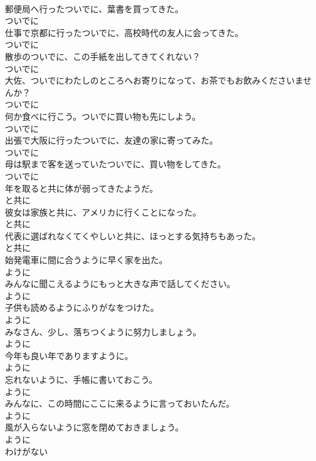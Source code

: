 \documentclass[8pt]{extreport}
\begin{document}
\begin{CJK}{UTF8}{min}
\\	郵便局へ行ったついでに、葉書を買ってきた。	
\\	ついでに
\\	仕事で京都に行ったついでに、高校時代の友人に会ってきた。	
\\	ついでに
\\	散歩のついでに、この手紙を出してきてくれない？	
\\	ついでに
\\	大佐、ついでにわたしのところへお寄りになって、お茶でもお飲みくださいませんか？	
\\	ついでに
\\	何か食べに行こう。ついでに買い物も先にしよう。	
\\	ついでに
\\	出張で大阪に行ったついでに、友達の家に寄ってみた。	
\\	ついでに
\\	母は駅まで客を送っていたついでに、買い物をしてきた。	
\\	ついでに
\\	年を取ると共に体が弱ってきたようだ。	
\\	と共に
\\	彼女は家族と共に、アメリカに行くことになった。	
\\	と共に
\\	代表に選ばれなくてくやしいと共に、ほっとする気持ちもあった。	
\\	と共に
\\	始発電車に間に合うように早く家を出た。	
\\	ように
\\	みんなに聞こえるようにもっと大きな声で話してください。	
\\	ように
\\	子供も読めるようにふりがなをつけた。	
\\	ように
\\	みなさん、少し、落ちつくように努力しましょう。	
\\	ように
\\	今年も良い年でありますように。	
\\	ように
\\	忘れないように、手帳に書いておこう。	
\\	ように
\\	みんなに、この時間にここに来るように言っておいたんだ。	
\\	ように
\\	風が入らないように窓を閉めておきましょう。	
\\	ように
\\	わけがない	

\end{CJK}
\end{document}
